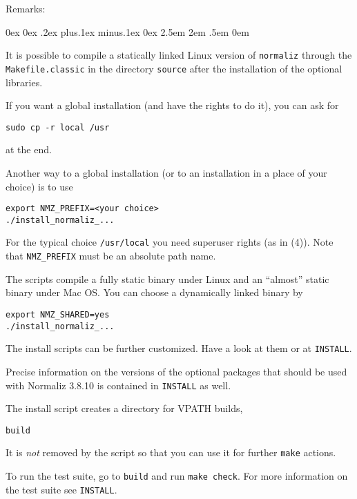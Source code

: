 \documentclass[12pt,a4paper]{scrartcl}
\newcounter{listi}
\newcommand{\stdli}{ \topsep0ex \partopsep0ex %
\parsep.2ex plus.1ex minus.1ex \itemsep0ex%
\leftmargin2.5em \labelwidth2em \labelsep.5em \rightmargin0em}%
\newenvironment{arab}{\begin{list}{\textup{(\arabic{listi})}}%
	{\usecounter{listi}\stdli}}{\end{list}}
\theoremstyle{definition}
\def\ttt{\texttt}
\def\version{3.8.10}
\begin{document}
Remarks:
\begin{arab}
\item It is possible to compile a statically linked Linux version of  \verb|normaliz|  through the \verb|Makefile.classic| in the directory \verb|source| after the installation of the optional libraries.

\item If you want a global installation (and have the rights to do it), you can ask for
\begin{Verbatim}
sudo cp -r local /usr
\end{Verbatim}
at the end.

\item Another way to a global installation (or to an installation in a place of your choice) is to use
\begin{Verbatim}
export NMZ_PREFIX=<your choice>  
./install_normaliz_...
\end{Verbatim}

For the typical choice \verb|/usr/local| you need superuser rights (as in (4)). Note that \verb|NMZ_PREFIX| must be an absolute path name.

\item The scripts compile a fully static binary under Linux and an ``almost'' static binary under Mac OS. You can choose a dynamically linked binary by
\begin{Verbatim}
export NMZ_SHARED=yes
./install_normaliz_...
\end{Verbatim}

\item The install scripts can be further customized. Have a look at them or at \verb|INSTALL|.

\item Precise information on the versions of the optional packages that should be used with Normaliz \version{} is contained in \verb|INSTALL| as well.

\item The install script creates a directory for VPATH builds,
\begin{center}
	\ttt{build}
\end{center}
It is \emph{not} removed by the script so that you can use it for further \ttt{make} actions.

\item To run the test suite, go to \ttt{build} and run \ttt{make check}. For more information on the test suite see \verb|INSTALL|.
\end{arab}
\end{document}
